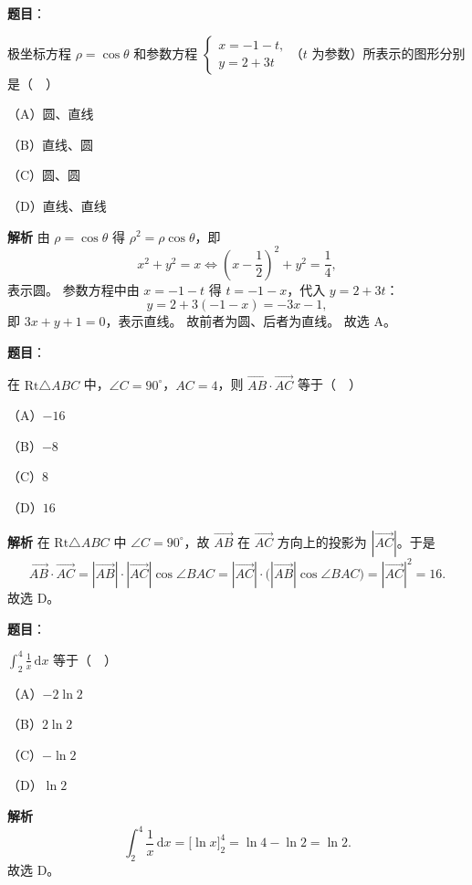 \begin{answer}

\textbf{题目}：

极坐标方程 $\rho=\cos\theta$ 和参数方程 $\begin{cases}x=-1-t,\\ y=2+3t\end{cases}$（$t$ 为参数）所表示的图形分别是（　）

（A）圆、直线

（B）直线、圆

（C）圆、圆

（D）直线、直线

\textbf{解析}
由 $\rho=\cos\theta$ 得 $\rho^2=\rho\cos\theta$，即
\nopagebreak[4]
\[x^2+y^2=x\iff\left(x-\frac12\right)^2+y^2=\frac14,\]
表示圆。
参数方程中由 $x=-1-t$ 得 $t=-1-x$，代入 $y=2+3t$：
\nopagebreak[4]
\[y=2+3(-1-x)=-3x-1,\]
即 $3x+y+1=0$，表示直线。
故前者为圆、后者为直线。
故选 A。


\end{answer}
\begin{answer}

\textbf{题目}：

在 $\mathrm{Rt}\triangle ABC$ 中，$\angle C=90^\circ$，$AC=4$，则 $\overrightarrow{AB}\cdot\overrightarrow{AC}$ 等于（　）

（A）$-16$

（B）$-8$

（C）$8$

（D）$16$

\textbf{解析}
在 $\mathrm{Rt}\triangle ABC$ 中 $\angle C=90^\circ$，故 $\overrightarrow{AB}$ 在 $\overrightarrow{AC}$ 方向上的投影为 $|\overrightarrow{AC}|$。于是
\nopagebreak[4]
\[\overrightarrow{AB}\cdot\overrightarrow{AC}=|\overrightarrow{AB}|\cdot|\overrightarrow{AC}|\cos\angle BAC
=|\overrightarrow{AC}|\cdot\bigl(|\overrightarrow{AB}|\cos\angle BAC\bigr)
=|\overrightarrow{AC}|^2=16.\]
故选 D。


\end{answer}
\begin{answer}

\textbf{题目}：

$\displaystyle\int_2^4\frac1x\,\mathrm dx$ 等于（　）

（A）$-2\ln2$

（B）$2\ln2$

（C）$-\ln2$

（D）$\ln2$

\textbf{解析}
\nopagebreak[4]
\[\int_2^4\frac1x\,\mathrm dx=\bigl[\ln x\bigr]_2^4=\ln4-\ln2=\ln2.\]
故选 D。


\end{answer}
